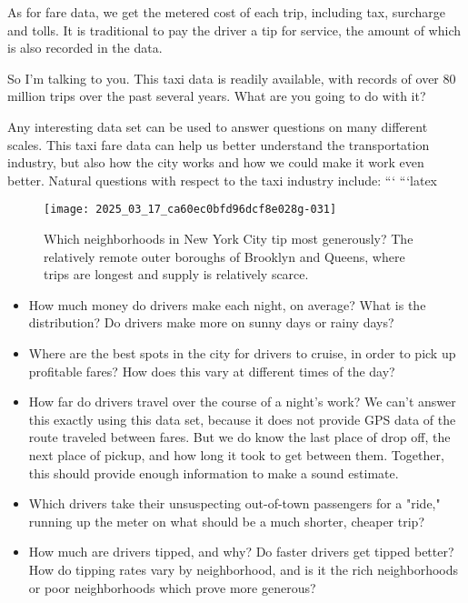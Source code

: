 \documentclass[10pt]{article}
\begin{document}
As for fare data, we get the metered cost of each trip, including tax, surcharge and tolls. It is traditional to pay the driver a tip for service, the amount of which is also recorded in the data.

So I'm talking to you. This taxi data is readily available, with records of over 80 million trips over the past several years. What are you going to do with it?

Any interesting data set can be used to answer questions on many different scales. This taxi fare data can help us better understand the transportation industry, but also how the city works and how we could make it work even better. Natural questions with respect to the taxi industry include:
```
```latex
\begin{figure}[h!]
\centering
\texttt{[image: 2025\_03\_17\_ca60ec0bfd96dcf8e028g-031]}
\caption{Which neighborhoods in New York City tip most generously? The relatively remote outer boroughs of Brooklyn and Queens, where trips are longest and supply is relatively scarce.}
\label{fig:1.7}
\end{figure}

\begin{itemize}
  \item How much money do drivers make each night, on average? What is the distribution? Do drivers make more on sunny days or rainy days?
  \item Where are the best spots in the city for drivers to cruise, in order to pick up profitable fares? How does this vary at different times of the day?
  \item How far do drivers travel over the course of a night's work? We can't answer this exactly using this data set, because it does not provide GPS data of the route traveled between fares. But we do know the last place of drop off, the next place of pickup, and how long it took to get between them. Together, this should provide enough information to make a sound estimate.
  \item Which drivers take their unsuspecting out-of-town passengers for a "ride," running up the meter on what should be a much shorter, cheaper trip?
  \item How much are drivers tipped, and why? Do faster drivers get tipped better? How do tipping rates vary by neighborhood, and is it the rich neighborhoods or poor neighborhoods which prove more generous?
\end{itemize}
\end{document}

